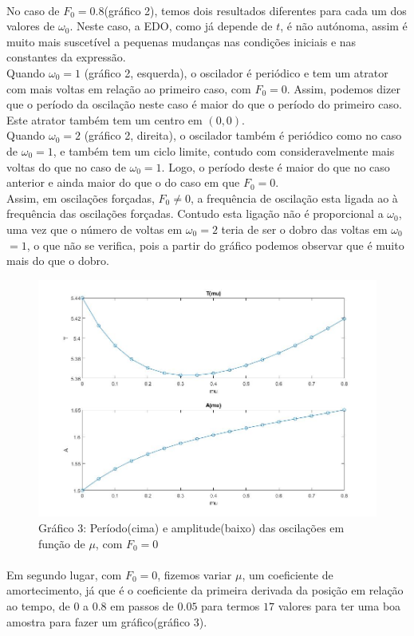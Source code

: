 \documentclass[a4paper, 11pt]{article}
\newcommand{\f}{$F_{0}$}
\newcommand{\w}{$\omega_{0}$}
\begin{document}
	\paragraph{}
	No caso de \f$=0.8$(gráfico 2), temos dois resultados diferentes para cada um dos valores de \w. Neste caso, a EDO, como já depende de $t$, é não autónoma, assim é muito mais suscetível a pequenas mudanças nas condições iniciais e nas constantes da expressão. \\
	Quando \w$=1$ (gráfico 2, esquerda), o oscilador é periódico e tem um atrator com mais voltas em relação ao primeiro caso, com \f$=0$. Assim, podemos dizer que o período da oscilação neste caso é maior do que o período do primeiro caso. Este atrator também tem um centro em $(0, 0)$. \\
	Quando \w$=2$ (gráfico 2, direita), o oscilador também é periódico como no caso de \w$=1$, e também tem um ciclo limite, contudo com consideravelmente mais voltas do que no caso de \w$=1$. Logo, o período deste é maior do que no caso anterior e ainda maior do que o do caso em que \f$=0$. \\
	Assim, em oscilações forçadas, \f$\ne0$, a frequência de oscilação esta ligada ao à frequência das oscilações forçadas. Contudo esta ligação não é proporcional a \w, uma vez que o número de voltas em \w$=2$ teria de ser o dobro das voltas em \w$=1$, o que não se verifica, pois a partir do gráfico podemos observar que é muito mais do que o dobro. 
	\begin{figure}[h]
		\centering
		\captionsetup{labelformat=empty}
		\includegraphics[width=\textwidth, height=0.55\textwidth]{A_T_mu}
		\caption{\scriptsize Gráfico 3: Período(cima) e amplitude(baixo) das oscilações em função de $\mu$, com \f$=0$}
	\end{figure}
	\paragraph{}
	Em segundo lugar, com \f$=0$, fizemos variar $\mu$, um coeficiente de amortecimento, já que é o coeficiente da primeira derivada da posição em relação ao tempo, de $0$ a $0.8$ em passos de $0.05$ para termos $17$ valores para ter uma boa amostra para fazer um gráfico(gráfico 3).
	
\end{document}
